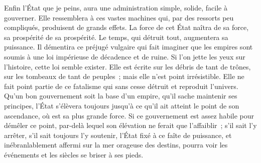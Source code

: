 \documentclass[french,twoside]{book} %
\begin{document}
Enfin l’État que je peins, aura une administration simple, solide, facile à gouverner. Elle ressemblera à ces vastes machines qui, par des ressorts peu compliqués, produisent de grands effets. La force de cet État naîtra de sa force, sa prospérité de sa prospérité. Le temps, qui détruit tout, augmentera sa puissance. Il démentira ce préjugé vulgaire qui fait imaginer que les empires sont soumis à une loi impérieuse de décadence et de ruine. Si l’on jette les yeux sur l’histoire, cette loi semble exister. Elle est écrite sur les débris de tant de trônes, sur les tombeaux de tant de peuples ; mais elle n’est point irrésistible. Elle ne fait point partie de ce fatalisme qui sans cesse détruit et reproduit l’univers. Qu’un bon gouvernement soit la base d’un empire, qu’il sache maintenir ses principes, l’État s’élèvera toujours jusqu’à ce qu’il ait atteint le point de son ascendance, où est sa plus grande force. Si ce gouvernement est assez habile pour démêler ce point, par-delà lequel son élévation ne ferait que l’affaiblir ; s’il sait l’y arrêter, s’il sait toujours l’y soutenir, l’État fixé à ce faîte de puissance, et inébranlablement affermi sur la mer orageuse des destins, pourra voir les événements et les siècles se briser à ses pieds.\par
\end{document}

